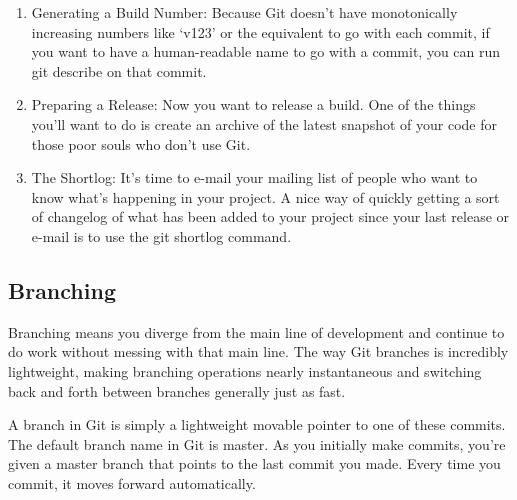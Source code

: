 \documentclass[draftclsnofoot,journal,onecolumn,12pt]{IEEEtran}
\begin{document}
\begin{enumerate}
  \item Generating a Build Number: Because Git doesn’t have monotonically increasing numbers like ‘v123’ or the equivalent to go with each commit, if you want to have a human-readable name to go with a commit, you can run git describe on that commit.
  \item Preparing a Release: Now you want to release a build. One of the things you’ll want to do is create an archive of the latest snapshot of your code for those poor souls who don’t use Git.
  \item The Shortlog: It’s time to e-mail your mailing list of people who want to know what’s happening in your project. A nice way of quickly getting a sort of changelog of what has been added to your project since your last release or e-mail is to use the git shortlog command.
\end{enumerate}

\subsection{Branching}
Branching means you diverge from the main line of development and continue to do work without messing with that main line. The way Git branches is incredibly lightweight, making branching operations nearly instantaneous and switching back and forth between branches generally just as fast.

A branch in Git is simply a lightweight movable pointer to one of these commits. The default branch name in Git is master. As you initially make commits, you’re given a master branch that points to the last commit you made. Every time you commit, it moves forward automatically.
\end{document}
